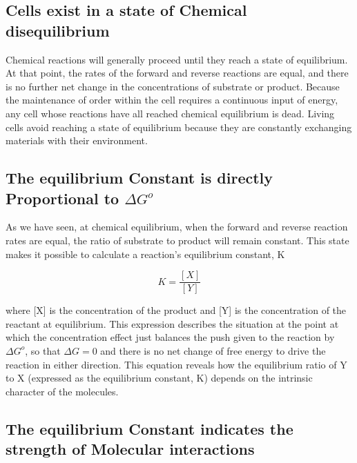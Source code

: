 \subsection{Cells exist in a state of Chemical disequilibrium}

Chemical reactions will generally proceed until they reach a state of
equilibrium. At that point, the rates of the forward and reverse reactions
are equal, and there is no further net change in the concentrations of
substrate or product. Because the maintenance of order within the cell
requires a continuous input of energy, any cell whose reactions have all
reached chemical equilibrium is dead.
Living cells avoid reaching a state of equilibrium because they are constantly
exchanging materials with their environment.

\subsection{The equilibrium Constant is directly Proportional to $\Delta G^{o}$}

As we have seen, at chemical equilibrium, when the forward and reverse
reaction rates are equal, the ratio of substrate to product will remain constant.
This state makes it possible to calculate a reaction’s equilibrium
constant, K

\begin{equation}
K = \frac{[X]}{[Y]}
\end{equation}

where [X] is the concentration of the product and [Y] is the concentration
of the reactant at equilibrium. This expression describes the situation at
the point at which the concentration effect just balances the push given
to the reaction by $\Delta G^{o}$, so that $\Delta G = 0$ and there is no net change of free
energy to drive the reaction in either direction.
This equation reveals how the equilibrium ratio of Y to X (expressed as
the equilibrium constant, K) depends on the intrinsic character of the molecules.


\subsection{The equilibrium Constant indicates the strength of Molecular interactions}


